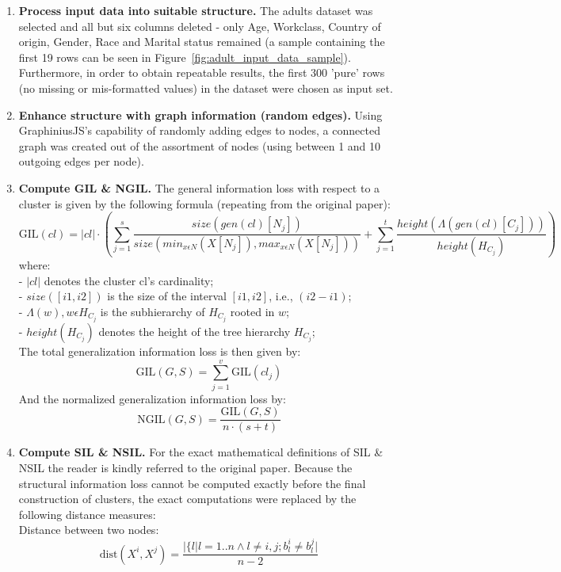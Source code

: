 \documentclass{llncs}
\providecommand{\abs}[1]{\lvert#1\rvert}
\begin{document}
\begin{enumerate}
	\item \textbf{Process input data into suitable structure.} The adults dataset was selected and all but six columns deleted - only Age, Workclass, Country of origin, Gender, Race and Marital status remained (a sample containing the first 19 rows can be seen in Figure~\ref{fig:adult_input_data_sample}). Furthermore, in order to obtain repeatable results, the first 300 'pure' rows (no missing or mis-formatted values) in the dataset were chosen as input set.
	
	\item \textbf{Enhance structure with graph information (random edges).} Using GraphiniusJS's capability of randomly adding edges to nodes, a connected graph was created out of the assortment of nodes (using between 1 and 10 outgoing edges per node).
	
	\item \textbf{Compute GIL \& NGIL.} The general information loss with respect to a cluster is given by the following formula (repeating from the original paper):
	\begin{equation*}
	\text{GIL}(cl) = \abs{cl} \cdot (\sum_{j=1}^{s} \frac{size(gen(cl)[N_j])}{size(min_{x \epsilon N} (X[N_j]), max_{x \epsilon N} (X[N_j]))} + \sum_{j=1}^{t} \frac{height(\Lambda(gen(cl)[C_j]))}{height(H_{C_j})})
	\end{equation*}
	where:\\
	- $\abs{cl}$ denotes the cluster cl's cardinality; \\
	- $size([i1,i2])$ is the size of the interval $[i1,i2]$, i.e., $(i2-i1)$; \\
	- $\Lambda(w), w \epsilon H_{C_j}$ is the subhierarchy of $H_{C_j}$ rooted in $w$; \\
	- $height(H_{C_j})$ denotes the height of the tree hierarchy $H_{C_j}$; \\
	
	The total generalization information loss is then given by:
	\begin{equation*}
	\text{GIL}(G,S) = \sum_{j=1}^{v} \text{GIL}(cl_j)
	\end{equation*}
	And the normalized generalization information loss by:
	\begin{equation*}
	\text{NGIL}(G,S) = \frac{\text{GIL}(G,S)}{n \cdot (s+t)}
	\end{equation*}
	
	\item \textbf{Compute SIL \& NSIL.} For the exact mathematical definitions of SIL \& NSIL the reader is kindly referred to the original paper. Because the structural information loss cannot be computed exactly before the final construction of clusters, the exact computations were replaced by the following distance measures: \\
	Distance between two nodes:
	\begin{equation*}
	\text{dist}(X^i, X^j) = \frac{\abs{\{l|l=1..n \wedge l \ne i,j;b_l^i \ne b_l^j}}{n-2}
	\end{equation*}
	

\end{enumerate}
\end{document}

